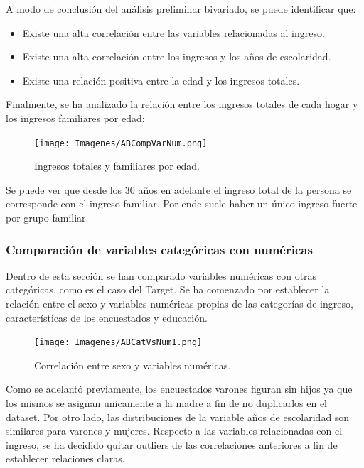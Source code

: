 \documentclass[a4paper]{article}
\begin{document}
        A modo de conclusión del análisis preliminar bivariado, se puede identificar que:
        \begin{itemize}
            \item Existe una alta correlación entre las variables relacionadas al ingreso.
            \item Existe una alta correlación entre los ingresos y los años de escolaridad.
            \item Existe una relación positiva entre la edad y los ingresos totales.
        \end{itemize}
 \vspace{1cm}
            Finalmente, se ha analizado la relación entre los ingresos totales de cada hogar y los ingresos familiares por edad:
            \begin{figure}[H]
                \centering
                \texttt{[image: Imagenes/ABCompVarNum.png]}
                \caption{Ingresos totales y familiares por edad.}
                \label{AB Income and age relationship}
            \end{figure}
 
            Se puede ver que desde los 30 años en adelante el ingreso total de la persona se corresponde con el ingreso familiar. Por ende suele haber un único ingreso fuerte por grupo familiar.
 
        \subsubsection{Comparación de variables categóricas con numéricas}
 
            Dentro de esta sección se han comparado variables numéricas con otras categóricas, como es el caso del Target. Se ha comenzado por establecer la relación entre el sexo y variables numéricas propias de las categorías de ingreso, características de los encuestados y educación.
 
            \begin{figure}[H]
                \centering
                \texttt{[image: Imagenes/ABCatVsNum1.png]}
                \caption{Correlación entre sexo y variables numéricas.}
                \label{AB genre and numeric variables}
            \end{figure}
 
            Como se adelantó previamente, los encuestados varones figuran sin hijos ya que los mismos se asignan unicamente a la madre a fin de no duplicarlos en el dataset. Por otro lado, las distribuciones de la variable años de escolaridad son similares para varones y mujeres.
            Respecto a las variables relacionadas con el ingreso, se ha decidido quitar outliers de las correlaciones anteriores a fin de establecer relaciones claras.
 
\end{document}
